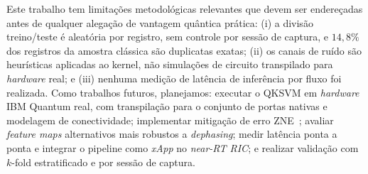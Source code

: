 \documentclass[12pt]{article}
\begin{document}
Este trabalho tem limitações metodológicas relevantes que devem ser endereçadas antes de qualquer alegação de vantagem quântica prática: (i) a divisão treino/teste é aleatória por registro, sem controle por sessão de captura, e $14{,}8\%$ dos registros da amostra clássica são duplicatas exatas; (ii) os canais de ruído são heurísticas aplicadas ao kernel, não simulações de circuito transpilado para \textit{hardware} real; e (iii) nenhuma medição de latência de inferência por fluxo foi realizada. Como trabalhos futuros, planejamos: executar o QKSVM em \textit{hardware} IBM Quantum real, com transpilação para o conjunto de portas nativas e modelagem de conectividade; implementar mitigação de erro ZNE~\cite{temme2017}; avaliar \textit{feature maps} alternativos mais robustos a \textit{dephasing}; medir latência ponta a ponta e integrar o pipeline como \textit{xApp} no \textit{near-RT RIC}; e realizar validação com $k$-fold estratificado e por sessão de captura.




\end{document}
